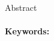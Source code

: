 \documentclass[12pt, twoside]{book}
\renewcommand{\section}[2][]{}
\renewcommand{\tableofcontents}{}
\begin{document}
\newpage

\begin{otherlanguage}{USenglish}
    \section*{Abstract}

    \thesisabstracten{}

    \paragraph*{Keywords:} \thesiskeywordsen{}
\end{otherlanguage}

\newpage
\tableofcontents

\newpage
\listoffigures

\mainmatter{}
\thesischapters{}

\newpage
\thispagestyle{empty}




\appendix
\thesisappendices{}
\end{document}
